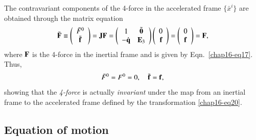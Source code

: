 The contravariant components of the 4-force in the accelerated frame $\{\bar{x}^i\}$  are obtained through the matrix equation
\begin{equation}
\bar{\mathbf{F}}\equiv \left(\begin{array}{c} \bar{F}^0 \\
\bar{\mathbf{f}} \end{array}\right)=
\mathbf{J}\mathbf{F}=\left(\begin{array}{cc} 1 & \tilde{\mathbf{0}}  \\
-{\mathbf{\dot{q}}}& \mathbf{E}_3 \end{array}\right) 
\left(\begin{array}{rc}0 \\{\mathbf{f}} \end{array}\right)= 
\left(\begin{array}{cc} 0 \\ {\mathbf{f}}
\end{array}\right)={\mathbf{F}},\label{chap16-eq33}
\end{equation}
where $\mathbf{F}$ is the 4-force in the inertial frame and is given by Eqn.~\eqref{chap16-eq17}. Thus,
\begin{equation}
\bar{F}^0={F}^0=0, \quad \bar{\mathbf{f}}=\mathbf{f},\label{chap16-eq34}
\end{equation}
showing that the \textsl{4-force} is actually \textsl{invariant} under the map from an inertial frame to the  accelerated frame defined by the transformation 
\eqref{chap16-eq20}.

\subsection{Equation of motion}\label{chap16-sec6.7}

